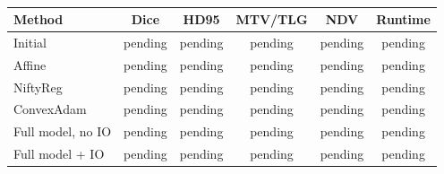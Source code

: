 \begin{table}[htbp]
\journalcolor
\centering
\caption{}
\label{tab:journal_baselines}
\scriptsize
\setlength{\tabcolsep}{3pt}
\begin{tabular}{lccccc}
\toprule
Method & Dice & HD95 & MTV/TLG & NDV & Runtime \\
\midrule
Initial & pending & pending & pending & pending & pending \\
Affine & pending & pending & pending & pending & pending \\
NiftyReg & pending & pending & pending & pending & pending \\
ConvexAdam & pending & pending & pending & pending & pending \\
Full model, no IO & pending & pending & pending & pending & pending \\
Full model + IO & pending & pending & pending & pending & pending \\
\bottomrule
\end{tabular}
\end{table}
